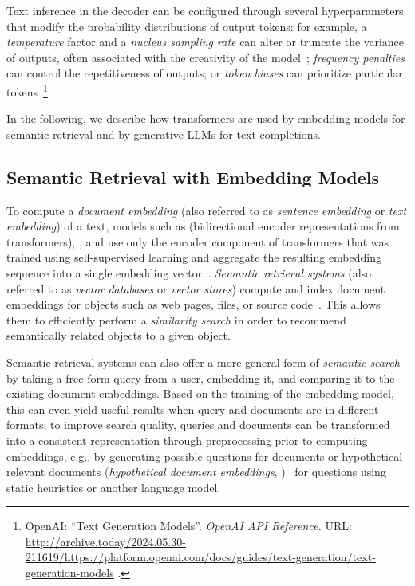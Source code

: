 \begin{description}[noextralabelsep]
	Text inference in the decoder can be configured through several hyperparameters that modify the probability distributions of output tokens:
	for example, a \emph{temperature} factor and a \emph{nucleus sampling rate} can alter or truncate the variance of outputs, often associated with the creativity of the model~\cite{holtzman2020curious}; \emph{frequency penalties} can control the repetitiveness of outputs; or \emph{token biases} can prioritize particular tokens~\footnote{
		OpenAI: ``Text Generation Models''. \emph{OpenAI API Reference.} URL:
		\url{http://archive.today/2024.05.30-211619/https://platform.openai.com/docs/guides/text-generation/text-generation-models}%
		.
	}.
\end{description}

In the following, we describe how transformers are used by embedding models for semantic retrieval and by generative LLMs for text completions.

\subsection{Semantic Retrieval with Embedding Models}
\label{sec:background/semtec/retrieval}

To compute a \emph{document embedding} (also referred to as \emph{sentence embedding} or \emph{text embedding}) of a text, models such as  (bidirectional encoder representations from transformers), , and  use only the encoder component of transformers that was trained using self-supervised learning and aggregate the resulting embedding sequence into a single embedding vector~\cite{devlin2019bert,raffel2023exploring}.
\emph{Semantic retrieval systems} (also referred to as \emph{vector databases} or \emph{vector stores}) compute and index document embeddings for objects such as web pages, files, or source code~\cite{lewis2020retrieval}.
This allows them to efficiently perform a \emph{similarity search} in order to recommend semantically related objects to a given object.

Semantic retrieval systems can also offer a more general form of \emph{semantic search} by taking a free-form query from a user, embedding it, and comparing it to the existing document embeddings.
Based on the training of the embedding model, this can even yield useful results when query and documents are in different formats; to improve search quality, queries and documents can be transformed into a consistent representation through preprocessing prior to computing embeddings, e.g., by generating possible questions for documents or hypothetical relevant documents (\emph{hypothetical document embeddings}, )~\cite{mao2021generation,gao2022precise} for questions using static heuristics or another language model.

